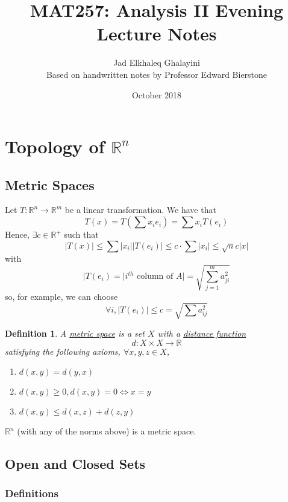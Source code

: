 \documentclass{article}
\title{MAT257: Analysis II Evening Lecture Notes}
\author{
  Jad Elkhaleq Ghalayini \\
  \normalsize Based on handwritten notes by Professor Edward Bierstone
}
\date{October 2018}
\newtheorem{definition}{Definition}
\newcommand{\reals}[0]{\mathbb{R}}
\begin{document}
\maketitle

\tableofcontents

\section{Topology of \(\reals^n\)}

\subsection{Metric Spaces}

Let \(T: \reals^n \to \reals^m\) be a linear transformation. We have that
\[T(x) = T\left(\sum x_ie_i\right) = \sum x_iT(e_i)\]
Hence, \(\exists c \in \reals^+\) such that
\[|T(x)| \leq \sum|x_i||T(e_i)| \leq c \cdot \sum|x_i| \leq \sqrt{n}c|x|\]
with
\[|T(e_i) = |i^{th} \text{ column of } A| = \sqrt{\sum_{j = 1}^ma_{ji}^2}\]
so, for example, we can choose
\[\forall i, |T(e_i)| \leq c = \sqrt{\sum a_{ij}^2}\]

\begin{definition}
  A \underline{metric space} is a set \(X\)  with a \underline{distance function}
  \[d: X \times X \to \reals\]
  satisfying the following axioms, \(\forall x, y, z \in X\),
  \begin{enumerate}
    \item \(d(x, y) = d(y, x)\)
    \item \(d(x, y) \geq 0, d(x, y) = 0 \iff x = y\)
    \item \(d(x, y) \leq d(x, z) + d(z, y)\)
  \end{enumerate}
\end{definition}
\(\reals^n\) (with any of the norms above) is a metric space.

\subsection{Open and Closed Sets}

\subsubsection{Definitions}
\end{document}
